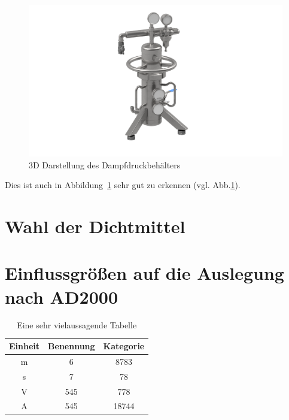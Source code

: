 \documentclass[
    12pt, %
    ngerman, %
    a4paper, %
    oneside, %
    headings=big, %
    nolistof=totoc, %
    nobibliography=totoc, %
    index=totoc, %
    captions=tableheading, %
    final %
    sectionentrydots=true,
    toc = bibliography
]{scrreprt}
\begin{document}
\par

\begin{figure}[htb]
    \centering  
    \includegraphics[keepaspectratio,width=\textwidth,height=\textheight]{render.png}
    \caption{3D Darstellung des Dampfdruckbehälters}\label{fig:render}
\end{figure}

\par

Dies ist auch in Abbildung~\ref{fig:render} sehr gut zu erkennen (vgl. Abb.\ref{fig:render}).

\blindtext[2] \par


\section{Wahl der Dichtmittel}
\blindtext[2] \par

\section{Einflussgrößen auf die Auslegung nach AD2000}
\blindtext[1]

\begin{table}[htb]
\centering
\begin{tabular}{|c|cc|} 
 \hline
 Einheit & Benennung & Kategorie \\ %
 \hline
 m & 6 & 8783 \\ 
 s & 7 & 78 \\
 V & 545 & 778\\
 A & 545 & 18744\\
 \hline
\end{tabular}
\caption{Eine sehr vielaussagende Tabelle}\label{vielaussagend}
\end{table}
\end{document}

